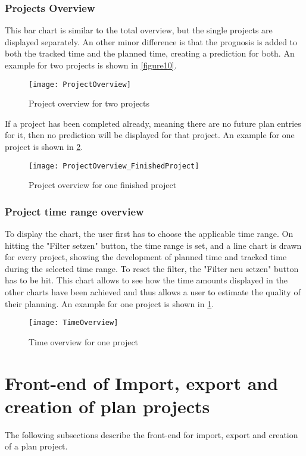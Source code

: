 \subsubsection{Projects Overview}
This bar chart is similar to the total overview, but the single projects are displayed separately. An other minor difference is that the prognosis is added to both the tracked time and the planned time, creating a prediction for both. An example for two projects is shown in \ref{figure10}.
\begin{figure}[H]
	\centering
	\texttt{[image: ProjectOverview]}
	\caption{Project overview for two projects}
	\label{figure11}
\end{figure}
If a project has been completed already, meaning there are no future plan entries for it, then no prediction will be displayed for that project. An example for one project is shown in \ref{figure12}.
\begin{figure}[H]
	\centering
	\texttt{[image: ProjectOverview\_FinishedProject]}
	\caption{Project overview for one finished project}
	\label{figure12}
\end{figure}

\subsubsection{Project time range overview}
To display the chart, the user first has to choose the applicable time range. On hitting the "Filter setzen" button, the time range is set, and a line chart is drawn for every project, showing the development of planned time and tracked time during the selected time range. To reset the filter, the "Filter neu setzen" button has to be hit. This chart allows to see how the time amounts displayed in the other charts have been achieved and thus allows a user to estimate the quality of their planning. An example for one project is shown in \ref{figure11}.
\begin{figure}[H]
	\centering
	\texttt{[image: TimeOverview]}
	\caption{Time overview for one project}
	\label{figure13}
\end{figure}

\section{Front-end of Import, export and creation of plan projects}
The following subsections describe the front-end for import, export and creation of a plan project.

